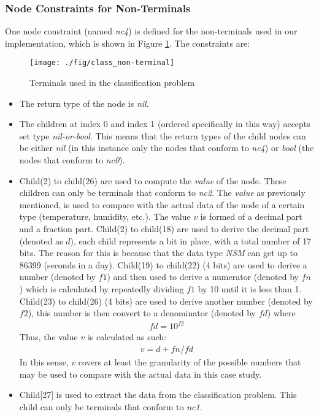\subsubsection{Node Constraints for Non-Terminals}
One node constraint (named \emph{nc4}) is defined for the non-terminals used in our implementation, which is shown in Figure \ref{fig:class-non-terminals}. The constraints are:
\begin{figure}
	\centering
	\texttt{[image: ./fig/class\_non-terminal]}
	\caption{Terminals used in the classification problem}
	\label{fig:class-non-terminals}
\end{figure}
\begin{itemize}
	\item The return type of the node is \emph{nil}. 
	\item The children at index 0 and index 1 (ordered specifically in this way) accepts set type \emph{nil-or-bool}. This means that the return types of the child nodes can be either \emph{nil} (in this instance only the nodes that conform to \emph{nc4}) or \emph{bool} (the nodes that conform to \emph{nc0}).
	\item Child(2) to child(26) are used to compute the \emph{value} of the node. These children can only be terminals that conform to \emph{nc2}. The \emph{value} as previously mentioned, is used to compare with the actual data of the node of a certain type (temperature, humidity, etc.). The value $v$ is formed of a decimal part and a fraction part. Child(2) to child(18) are used to derive the decimal part (denoted as $d$), each child represents a bit in place, with a total number of 17 bits. The reason for this is because that the data type \emph{NSM} can get up to 86399 (seconds in a day). Child(19) to child(22) (4 bits) are used to derive a number (denoted by $f1$) and then used to derive a numerator (denoted by $fn$) which is calculated by repeatedly dividing $f1$ by 10 until it is less than 1. Child(23) to child(26) (4 bits) are used to derive another number (denoted by $f2$), this number is then convert to a denominator (denoted by $fd$) where  
	\begin{align*}
		fd = 10^{f2}
	\end{align*}
	Thus, the value $v$ is calculated as such:
	\begin{align*}
		v = d + fn/fd
	\end{align*}
	In this sense, $v$ covers at least the granularity of the possible numbers that may be used to compare with the actual data in this case study.
	\item Child[27] is used to extract the data from the classification problem. This child can only be terminals that conform to \emph{nc1}. 
\end{itemize}

